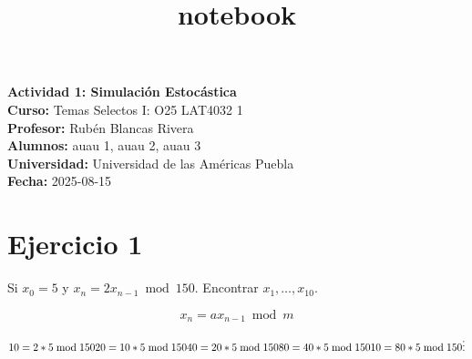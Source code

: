 \documentclass[11pt]{article}
\title{notebook}
\begin{document}
        
        

    \begin{titlepage}
    \centering

            \LARGE{\textbf{Actividad 1: Simulación
    Estocástica}}\\[0.5cm]

    \small
    \textbf{Curso:} Temas Selectos I: O25 LAT4032 1\\

    \textbf{Profesor:} Rubén Blancas Rivera\\

    \textbf{Alumnos:} auau 1, auau 2, auau 3\\  

    \textbf{Universidad:} Universidad de las Américas Puebla\\

    \textbf{Fecha:} 2025-08-15
        
    \restoregeometry
    \end{titlepage}
    \newpage
    \tableofcontents




    \hypertarget{ejercicio-1}{%
\section{Ejercicio 1}\label{ejercicio-1}}

Si \(x_0 = 5\) y \(x_n = 2x_{{n-1}} \bmod 150\). Encontrar
\(x_1, \dots, x_{{10}}\).

    \[
x_n = ax_{n-1} \bmod m
\]

    \[
10 = 2*5 \bmod 150 \\
20 = 10*5 \bmod 150 \\
40 = 20*5 \bmod 150 \\
80 = 40*5 \bmod 150 \\
10 = 80*5 \bmod 150 \\
\vdots
\]
\end{document}
